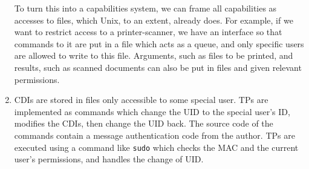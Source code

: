 \documentclass{article}
\begin{document}
\begin{enumerate}
    To turn this into a capabilities system, we can frame all capabilities as accesses to files, which Unix, to an extent, already does. For example, if we want to restrict access to a printer-scanner, we have an interface so that commands to it are put in a file which acts as a queue, and only specific users are allowed to write to this file. Arguments, such as files to be printed, and results, such as scanned documents can also be put in files and given relevant permissions.
    \setcounter{enumi}{26}
  \item CDIs are stored in files only accessible to some special user. TPs are implemented as commands which change the UID to the special user's ID, modifies the CDIs, then change the UID back. The source code of the commands contain a message authentication code from the author. TPs are executed using a command like \texttt{sudo} which checks the MAC and the current user's permissions, and handles the change of UID.
\end{enumerate}
\end{document}
